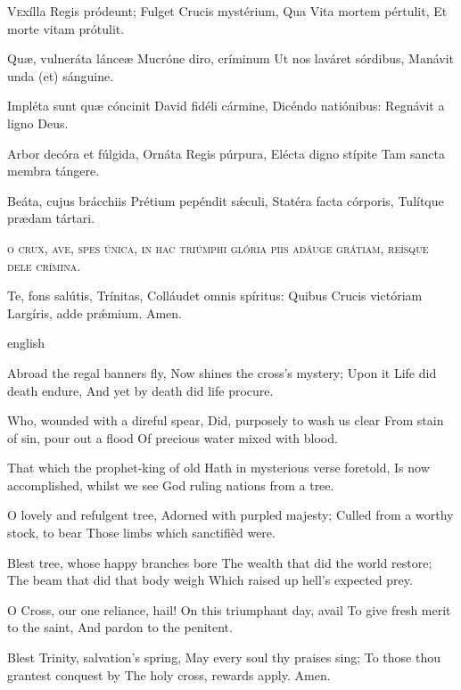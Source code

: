 
\texteparacol
{\lettrine{V}{e}xílla Regis pródeunt;
Fulget Crucis mystérium,
Qua Vita mortem pértulit,
Et morte vitam prótulit.

Quæ, vulneráta lánceæ
Mucróne diro, críminum
Ut nos laváret sórdibus,
Manávit unda (et) sánguine.

Impléta sunt quæ cóncinit
David fidéli cármine,
Dicéndo natiónibus:
Regnávit a ligno Deus.

Arbor decóra et fúlgida,
Ornáta Regis púrpura,
Elé\-cta digno stípite
Tam san\-cta membra tángere.

Beáta, cujus brácchiis
Prétium pepéndit sǽculi,
Statéra fa\-cta córporis,
Tulítque prædam tártari.

\textsc{o crux, ave, spes única,
in hac triúmphi glória
piis adáuge grátiam,
reísque dele crímina.}

Te, fons salútis, Trínitas,
Colláudet o\-mnis spíritus:
Quibus Crucis vi\-ctóriam
Largíris, adde prǽmium.
Amen.
}
{english}
{Abroad the regal banners fly,
Now shines the cross’s mystery;
Upon it Life did death endure,
And yet by death did life procure.

Who, wounded with a direful spear,
Did, purposely to wash us clear
From stain of sin, pour out a flood
Of precious water mixed with blood.

That which the prophet-king of old
Hath in mysterious verse foretold,
Is now accomplished, whilst we see
God ruling nations from a tree.

O lovely and refulgent tree,
Adorned with purpled majesty;
Culled from a worthy stock, to bear
Those limbs which sanctifièd were.

Blest tree, whose happy branches bore
The wealth that did the world restore;
The beam that did that body weigh
Which raised up hell’s expected prey.

O Cross, our one reliance, hail!
On this triumphant day, avail
To give fresh merit to the saint,
And pardon to the penitent.

Blest Trinity, salvation’s spring,
May every soul thy praises sing;
To those thou grantest conquest by
The holy cross, rewards apply. Amen.}